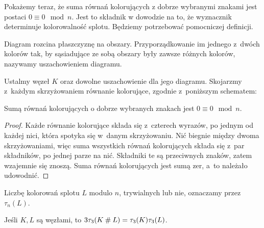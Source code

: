 Pokażemy teraz, że suma równań kolorujących z dobrze wybranymi znakami jest postaci $0 \equiv 0 \mod n$.
Jest to składnik w dowodzie na to, że wyznacznik determinuje kolorowalność splotu.
Będziemy potrzebować pomocniczej definicji.

\begin{definition}[uszachowienie]
%
    Diagram rozcina płaszczyznę na obszary.
    Przyporządkowanie im jednego z~dwóch kolorów tak, by sąsiadujące ze sobą obszary były zawsze różnych kolorów, nazywamy uszachowieniem diagramu.
\end{definition}

Ustalmy węzeł $K$ oraz dowolne uszachowienie dla jego diagramu.
Skojarzmy z~każdym skrzyżowaniem równanie kolorujące, zgodnie z~poniższym schematem:
\begin{comment}
\begin{figure}[H]
    \begin{minipage}[b]{.48\linewidth}
    \[
        \LargeCrossingChessboardA
    \]
    \subcaption{$+a-b+a-c=0 \mod n$}
    \end{minipage}
    \begin{minipage}[b]{.48\linewidth}
    \[
        \LargeCrossingChessboardB
    \]
    \subcaption{$-a+b-a+c=0 \mod n$}
    \end{minipage}
\end{figure}
\end{comment}

\begin{proposition}
    \label{prp:colouring_sum_zero}
    Sumą równań kolorujących o dobrze wybranych znakach jest $0 \equiv 0 \mod n$.
\end{proposition}

\begin{proof}
    Każde równanie kolorujące składa się z~czterech wyrazów, po jednym od każdej nici, która spotyka się w~danym skrzyżowaniu.
    Nić biegnie między dwoma skrzyżowaniami, więc suma wszystkich równań kolorujących składa się z~par składników, po jednej parze na nić.
    Składniki te są przeciwnych znaków, zatem wzajemnie się znoszą.
    Suma równań kolorujących jest sumą zer, a~to należało udowodnić.
\end{proof}

Liczbę kolorowań splotu $L$ modulo $n$, trywialnych lub nie, oznaczamy przez $\tau_n(L)$.

\begin{proposition}
    Jeśli $K, L$ są węzłami, to $3\tau_3(K \mathbin{\#} L) = \tau_3(K)\tau_3(L)$.
\end{proposition}

